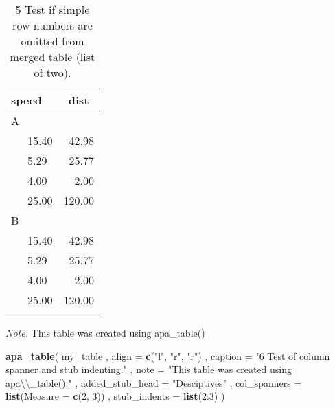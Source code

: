 \documentclass[english,man]{apa6}
\newenvironment{Shaded}{\begin{snugshade}}{\end{snugshade}}
\newcommand{\KeywordTok}[1]{\textcolor[rgb]{0.13,0.29,0.53}{\textbf{{#1}}}}
\newcommand{\DataTypeTok}[1]{\textcolor[rgb]{0.13,0.29,0.53}{{#1}}}
\newcommand{\DecValTok}[1]{\textcolor[rgb]{0.00,0.00,0.81}{{#1}}}
\newcommand{\CharTok}[1]{\textcolor[rgb]{0.31,0.60,0.02}{{#1}}}
\newcommand{\StringTok}[1]{\textcolor[rgb]{0.31,0.60,0.02}{{#1}}}
\newcommand{\NormalTok}[1]{{#1}}
\theoremstyle{definition}
\theoremstyle{definition}
\theoremstyle{definition}
\theoremstyle{remark}
\begin{document}
\begin{table}[tbp]
\begin{center}
\begin{threeparttable}
\caption{\label{tab:unnamed-chunk-4}5 Test if simple row numbers are omitted from merged table (list of two).}
\begin{tabular}{lr}
\toprule
speed & \multicolumn{1}{c}{dist}\\
\midrule
A & \\
\ \ \ 15.40 & 42.98\\
\ \ \ 5.29 & 25.77\\
\ \ \ 4.00 & 2.00\\
\ \ \ 25.00 & 120.00\\
B & \\
\ \ \ 15.40 & 42.98\\
\ \ \ 5.29 & 25.77\\
\ \ \ 4.00 & 2.00\\
\ \ \ 25.00 & 120.00\\
\bottomrule
\addlinespace
\end{tabular}
\begin{tablenotes}[para]
\textit{Note.} This table was created using apa\_table()
\end{tablenotes}
\end{threeparttable}
\end{center}
\end{table}

\begin{Shaded}
\begin{Highlighting}[]
\KeywordTok{apa_table}\NormalTok{(}
  \NormalTok{my_table}
  \NormalTok{, }\DataTypeTok{align =} \KeywordTok{c}\NormalTok{(}\StringTok{"l"}\NormalTok{, }\StringTok{"r"}\NormalTok{, }\StringTok{"r"}\NormalTok{)}
  \NormalTok{, }\DataTypeTok{caption =} \StringTok{"6 Test of column spanner and stub indenting."}
  \NormalTok{, }\DataTypeTok{note =} \StringTok{"This table was created using apa}\CharTok{\textbackslash{}\textbackslash{}}\StringTok{_table()."}
  \NormalTok{, }\DataTypeTok{added_stub_head =} \StringTok{"Desciptives"}
  \NormalTok{, }\DataTypeTok{col_spanners =} \KeywordTok{list}\NormalTok{(}\DataTypeTok{Measure =} \KeywordTok{c}\NormalTok{(}\DecValTok{2}\NormalTok{, }\DecValTok{3}\NormalTok{))}
  \NormalTok{, }\DataTypeTok{stub_indents =} \KeywordTok{list}\NormalTok{(}\DecValTok{2}\NormalTok{:}\DecValTok{3}\NormalTok{)}
\NormalTok{)}
\end{Highlighting}
\end{Shaded}
\end{document}
